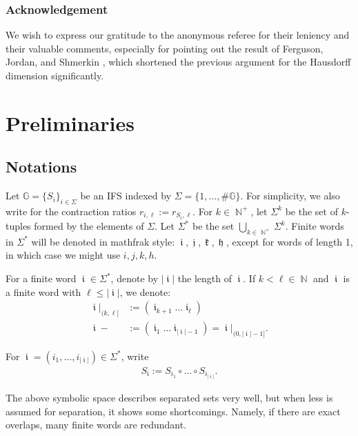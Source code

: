 \documentclass[a4paper, 11pt]{article}
\DeclareMathOperator{\N}{\mathbb{N}}
\DeclareMathOperator{\iii}{\mathfrak{i}}
\DeclareMathOperator{\jjj}{\mathfrak{j}}
\DeclareMathOperator{\kkk}{\mathfrak{k}}
\DeclareMathOperator{\hhh}{\mathfrak{h}}
\numberwithin{equation}{section}
\theoremstyle{plain}
\theoremstyle{remark}
\theoremstyle{definition}
\begin{document}
\subsubsection*{Acknowledgement}

We wish to express our gratitude to the anonymous referee for their leniency and their valuable comments, especially for pointing out the result of Ferguson, Jordan, and Shmerkin \cite{ferguson2009hausdorffdimensionprojectionsselfaffine}, which shortened the previous argument for the Hausdorff dimension significantly.

\section{Preliminaries}

\subsection{Notations}
\label{subsection:symbolic}
Let $\mathbb{G}=\{S_i\}_{ i \in \Sigma}$ be an IFS indexed by $\Sigma = \{1,\dots,\#\mathbb{G}\}$. For simplicity, we also write for the contraction ratios $r_{i,\ell}:= r_{S_i,\ell}$. For $k\in \N^+$, let $\Sigma^k$ be the set of $k$-tuples formed by the elements of $\Sigma$. Let $\Sigma^*$ be the set $\bigcup_{k \in \N^+}\Sigma^k$. Finite words in $\Sigma^*$ will be denoted in mathfrak style: $\iii,\jjj, \kkk, \hhh$, except for words of length 1, in which case we might use $i,j,k,h$.
	
For a finite word $\iii\in\Sigma^*$, denote by $|\iii|$ the length of $\iii$. If $k<\ell \in \N$ and $\iii$ is a finite word with $\ell\leq|\iii|$, we denote:
	\begin{align*}
		\iii|_{(k,\ell]} &:= (\iii_{k+1} \dots \iii_\ell) \\
		\iii- &:=  (\iii_{1} \dots \iii_{|\iii|-1}) = \iii|_{(0,|\iii|-1]}.
	\end{align*}

For $\iii=(i_1,\ldots,i_{|\iii|}) \in \Sigma^*$, write
\begin{align*}
	S_{\iii} := S_{i_1} \circ \dots \circ S_{i_{|\iii|}}.
\end{align*}

The above symbolic space describes separated sets very well, but when less is assumed for separation, it shows some shortcomings. Namely, if there are exact overlaps, many finite words are redundant.
\end{document}
